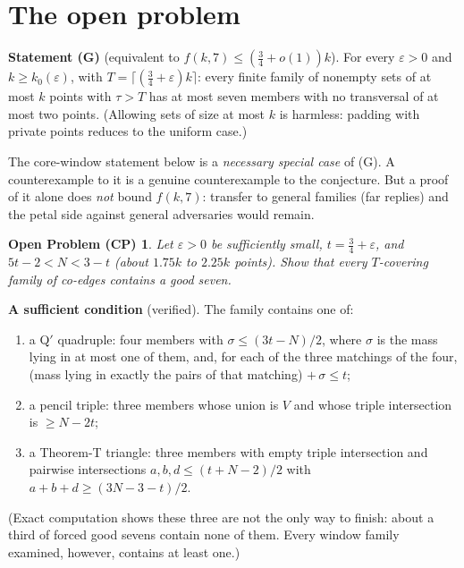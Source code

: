 \documentclass[11pt]{article}
\newtheorem*{problem}{Open Problem (CP)}
\begin{document}
\section{The open problem}
\noindent\textbf{Statement (G)} (equivalent to $f(k,7)\le(\tfrac34+o(1))k$). For every $\varepsilon>0$ and $k\ge
k_0(\varepsilon)$, with $T=\lceil(\tfrac34+\varepsilon)k\rceil$: every finite family of nonempty sets of at most $k$ points
with $\tau>T$ has at most seven members with no transversal of at most two points. (Allowing sets of size at most $k$ is
harmless: padding with private points reduces to the uniform case.)

\medskip
The core-window statement below is a \emph{necessary special case} of (G). A counterexample to it is a genuine
counterexample to the conjecture. But a proof of it alone does \emph{not} bound $f(k,7)$: transfer to general families
(far replies) and the petal side against general adversaries would remain.
\begin{problem}
Let $\varepsilon>0$ be sufficiently small, $t=\tfrac34+\varepsilon$, and $5t-2<N<3-t$ (about $1.75k$ to $2.25k$
points). Show that every $T$-covering family of co-edges contains a good seven.
\end{problem}

\noindent\textbf{A sufficient condition} (verified). The family contains one of:
\begin{enumerate}[label=(\alph*)]
\item a Q$'$ quadruple: four members with $\sigma\le(3t-N)/2$, where $\sigma$ is the mass lying in at most one of
them, and, for each of the three matchings of the four, (mass lying in exactly the pairs of that matching)
$+\,\sigma\le t$;
\item a pencil triple: three members whose union is $V$ and whose triple intersection is $\ge N-2t$;
\item a Theorem-T triangle: three members with empty triple intersection and pairwise intersections $a,b,d\le
(t+N-2)/2$ with $a+b+d\ge(3N-3-t)/2$.
\end{enumerate}
(Exact computation shows these three are not the only way to finish: about a third of forced good sevens contain none
of them. Every window family examined, however, contains at least one.)
\end{document}
